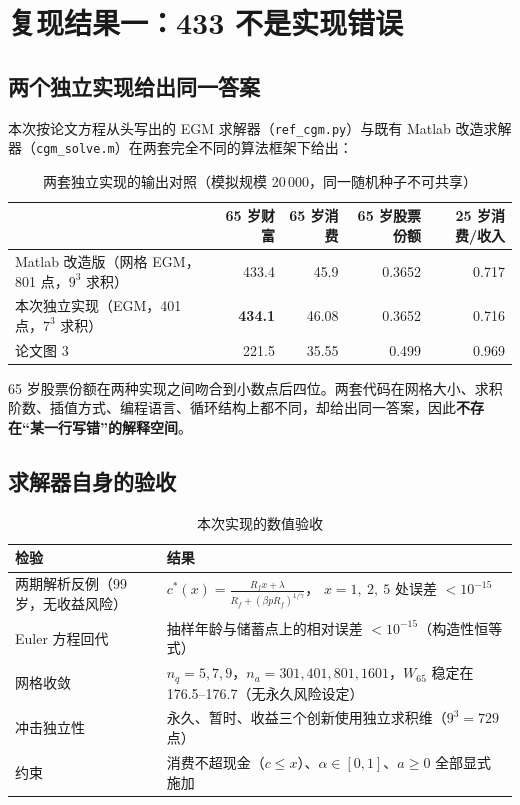 \documentclass[UTF8,a4paper,11pt,fontset=fandol]{ctexart}
\begin{document}
\section{复现结果一：433 不是实现错误}

\subsection{两个独立实现给出同一答案}
本次按论文方程从头写出的 EGM 求解器（\texttt{ref\_cgm.py}）与既有 Matlab 改造求解器（\texttt{cgm\_solve.m}）在两套完全不同的算法框架下给出：

\begin{table}[htbp]\centering\small
\caption{两套独立实现的输出对照（模拟规模 20\,000，同一随机种子不可共享）}\vspace{-2pt}
\begin{tabular}{@{}lrrrr@{}}\toprule
& 65 岁财富 & 65 岁消费 & 65 岁股票份额 & 25 岁消费/收入\\\midrule
Matlab 改造版（网格 EGM，801 点，\(9^3\) 求积） & 433.4 & 45.9 & 0.3652 & 0.717\\
本次独立实现（EGM，401 点，\(7^3\) 求积） & \textbf{434.1} & 46.08 & 0.3652 & 0.716\\
论文图 3 & 221.5 & 35.55 & 0.499 & 0.969\\\bottomrule
\end{tabular}
\end{table}

65 岁股票份额在两种实现之间吻合到小数点后四位。两套代码在网格大小、求积阶数、插值方式、编程语言、循环结构上都不同，却给出同一答案，因此\textbf{不存在“某一行写错”的解释空间}。

\subsection{求解器自身的验收}
\begin{table}[htbp]\centering\small
\caption{本次实现的数值验收}\vspace{-2pt}
\begin{tabular}{@{}p{}p{}@{}}\toprule
检验 & 结果\\\midrule
两期解析反例（99 岁，无收益风险） & \(c^*(x)=\frac{R_fx+\lambda}{R_f+(\beta p R_f)^{1/\gamma}}\)，
\(x=1,\ 2,\ 5\) 处误差 \(<10^{-15}\)\\
Euler 方程回代 & 抽样年龄与储蓄点上的相对误差 \(<10^{-15}\)（构造性恒等式）\\
网格收敛 & \(n_q=5,7,9\)，\(n_a=301,401,801,1601\)，\(W_{65}\) 稳定在 176.5--176.7（无永久风险设定）\\
冲击独立性 & 永久、暂时、收益三个创新使用独立求积维（\(9^3=729\) 点）\\
约束 & 消费不超现金（\(c\le x\)）、\(\alpha\in[0,1]\)、\(a\ge0\) 全部显式施加\\
\bottomrule
\end{tabular}
\end{table}
\end{document}
